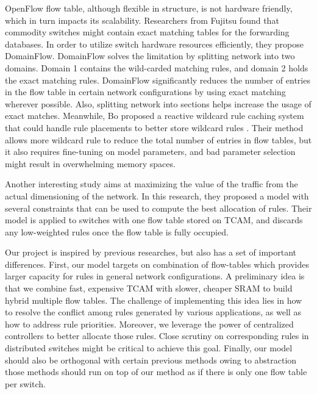 \documentclass[10pt,twocolumn,letterpaper]{article}
\begin{document}
OpenFlow flow table, although flexible in structure, is not hardware friendly, which in turn impacts its scalability. Researchers from Fujitsu\cite{nakagawa2013domainflow} found that commodity switches might contain exact matching tables for the forwarding databases. In order to utilize switch hardware resources efficiently, they propose DomainFlow. DomainFlow solves the limitation by splitting network into two domains. Domain 1 contains the wild-carded matching rules, and domain 2 holds the exact matching rules. DomainFlow significantly reduces the number of entries in the flow table in certain network configurations by using exact matching wherever possible. Also, splitting network into sections helps increase the usage of exact matches.  Meanwhile, Bo \etal proposed a reactive wildcard rule caching system that could handle rule placements to better store wildcard rules \cite{yan2014cab}. Their method allows more wildcard rule to reduce the total number of entries in flow tables, but it also requires fine-tuning on model parameters, and bad parameter selection might result in overwhelming memory spaces.

Another interesting study aims at maximizing the value of the traffic from the actual dimensioning of the network\cite{nguyen2014optimizing}. In this research, they proposed a model with several constraints that can be used to compute the best allocation of rules. Their model is applied to switches with one flow table stored on TCAM, and discards any low-weighted rules once the flow table is fully occupied.  

Our project is inspired by previous researches, but also has a set of important differences. First, our model targets on combination of flow-tables which provides larger capacity for rules in general network configurations. A preliminary idea is that we combine fast, expensive TCAM with slower, cheaper SRAM to build hybrid multiple flow tables. The challenge of implementing this idea lies in how to resolve the conflict among rules generated by various applications, as well as how to address rule priorities. Moreover, we leverage the power of centralized controllers to better allocate those rules. Close scrutiny on corresponding rules in distributed switches might be critical to achieve this goal. Finally, our model should also be orthogonal with certain previous methods \cite{yu2010scalable,curtis2011devoflow} owing to abstraction \textemdash those methods should run on top of our method as if there is only one flow table per switch.
\end{document}
